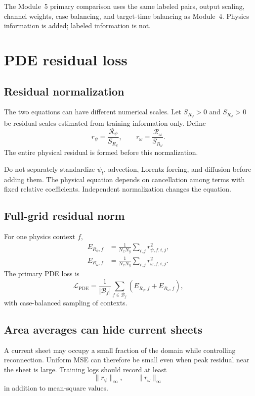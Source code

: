 \documentclass[11pt]{article}
\newcommand{\Rpsi}{\mathcal{R}_{\psi}}
\newcommand{\Romega}{\mathcal{R}_{\omega}}
\newcommand{\Lpde}{\mathcal{L}_{\mathrm{PDE}}}
\begin{document}
\begin{conventionbox}
The Module~5 primary comparison uses the same labeled pairs, output scaling, channel weights, case balancing, and target-time balancing as Module~4. Physics information is added; labeled information is not.
\end{conventionbox}

\section{PDE residual loss}
\label{sec:pde_loss}

\subsection{Residual normalization}
The two equations can have different numerical scales. Let $S_{R_\psi}>0$ and $S_{R_\omega}>0$ be residual scales estimated from training information only. Define
\begin{equation}
r_\psi=\frac{\Rpsi}{S_{R_\psi}},
\qquad
r_\omega=\frac{\Romega}{S_{R_\omega}}.
\end{equation}
The entire physical residual is formed before this normalization.

\begin{warningbox}
Do not separately standardize $\psi_t$, advection, Lorentz forcing, and diffusion before adding them. The physical equation depends on cancellation among terms with fixed relative coefficients. Independent normalization changes the equation.
\end{warningbox}

\subsection{Full-grid residual norm}
For one physics context $f$,
\begin{align}
E_{R_\psi,f}&=\frac{1}{N_xN_y}\sum_{i,j}r_{\psi,f,i,j}^2,\\
E_{R_\omega,f}&=\frac{1}{N_xN_y}\sum_{i,j}r_{\omega,f,i,j}^2.
\end{align}
The primary PDE loss is
\begin{equation}
\Lpde=
\frac{1}{|\mathcal{B}_f|}
\sum_{f\in\mathcal{B}_f}
\left(E_{R_\psi,f}+E_{R_\omega,f}\right),
\label{eq:pde_loss}
\end{equation}
with case-balanced sampling of contexts.

\subsection{Area averages can hide current sheets}
A current sheet may occupy a small fraction of the domain while controlling reconnection. Uniform MSE can therefore be small even when peak residual near the sheet is large. Training logs should record at least
\begin{equation}
\|r_\psi\|_\infty,\qquad \|r_\omega\|_\infty
\end{equation}
in addition to mean-square values.
\end{document}

